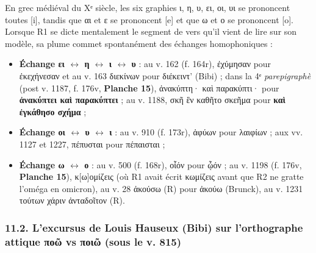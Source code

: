 \documentclass[11pt, a4paper, twoside]{article}
\renewcommand{\_}{\origunderscore\penalty0\relax}
\renewcommand{\texttt}[1]{#1}
\newcommand{\R}{\textbf{R}}
\newcommand{\Run}{\textbf{R}\textsuperscript{1}}
\newcommand{\Rdeux}{\textbf{R}\textsuperscript{2}}
\newcommand{\Bibi}{\textit{Bibi}}
\newcommand{\inRas}[2]{[\kern-0.15em[#1]\kern-0.15em]#2}
\def\R{R}%
\def\Run{R1}%
\def\Rdeux{R2}%
\def\Bibi{Bibi}%
\def\inRas#1#2{[#1]#2}%
\begin{document}
En grec médiéval du Xᵉ siècle, les six graphies ι, η, υ, ει, οι, υι se prononcent toutes [i], tandis que αι et ε se prononcent [e] et que ω et ο se prononcent [o]. Lorsque \Run{} se dicte mentalement le segment de vers qu'il vient de lire sur son modèle, sa plume commet spontanément des échanges homophoniques :
\begin{itemize}[leftmargin=1.5em, itemsep=2pt]
  \item \textbf{Échange ει $\leftrightarrow$ η $\leftrightarrow$ ι $\leftrightarrow$ υ} : au v. 162 (\texttt{f. 164r}), \texttt{ἐχύμησαν} pour \texttt{ἐκεχήνεσαν} et au v. 163 \texttt{διεκίνων} pour \texttt{διέκειντ'} (\Bibi{}) ; dans la 4ᵉ \textit{parepigraphè} (post v. 1187, \texttt{f. 176v}, \textbf{Planche 15}), \texttt{ἀνακύπτη· καὶ παρακύπτι·} pour \textbf{\texttt{ἀνακύπτει καὶ παρακύπτει}} ; au v. 1188, \texttt{σκῆ ἓν καθῆτο σκεῆμα} pour \textbf{\texttt{καὶ ἐγκάθησο σχήμα}} ;
  \item \textbf{Échange οι $\leftrightarrow$ υ $\leftrightarrow$ ι} : au v. 910 (\texttt{f. 173r}), \texttt{ἀφύων} pour \texttt{λαιφίων} ; aux vv. 1127 et 1227, \texttt{πέπυσται} pour \texttt{πέπαισται} ;
  \item \textbf{Échange ω $\leftrightarrow$ ο} : au v. 500 (\texttt{f. 168r}), \texttt{οἷόν} pour \texttt{ᾦόν} ; au v. 1198 (\texttt{f. 176v}, \textbf{Planche 15}), \texttt{κ\inRas{ω}{ο}μίζεις} (où \Run{} avait écrit \texttt{κωμίζεις} avant que \Rdeux{} ne gratte l'oméga en omicron), au v. 28 \texttt{ἀκούσω} (\R{}) pour \texttt{ἀκούω} (Brunck), au v. 1231 \texttt{τούτων χάριν ἀνταδοῖτον} (\R{}).
\end{itemize}


\subsubsection{11.2. L'excursus de Louis Hauseux (\Bibi{}) sur l'orthographe attique \texttt{ποῶ} vs \texttt{ποιῶ} (sous le v. 815)}
\end{document}
